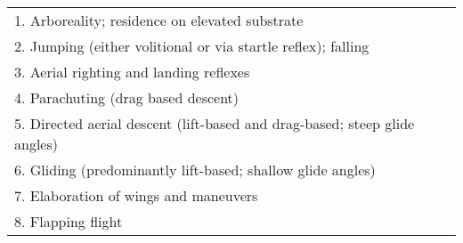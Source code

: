 \begin{tabular}{l}
1. Arboreality; residence on elevated substrate \\
2. Jumping (either volitional or via startle reflex); falling \\
3. Aerial righting and landing reflexes \\
4. Parachuting (drag based descent) \\ 
5. Directed aerial descent (lift-based and drag-based; steep glide angles) \\ 
6. Gliding (predominantly lift-based; shallow glide angles) \\ 
7. Elaboration of wings and maneuvers \\
8. Flapping flight \\ 
\end{tabular}
